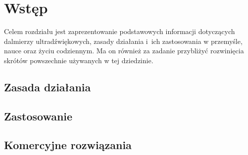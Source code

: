 \chapter{Wstęp}
\label{wstep}

Celem rozdziału jest zaprezentowanie podstawowych informacji dotyczących dalmierzy ultradźwiękowych, zasady działania i~ich zastosowania w przemyśle, nauce oraz życiu codziennym. 
Ma on również za zadanie przybliżyć rozwinięcia skrótów powszechnie używanych w tej dziedzinie.

\section{Zasada działania}\label{ch_02:zasada_dzialania}


\section{Zastosowanie} \label{sec:zastosowanie}

\section{Komercyjne rozwiązania} \label{sec:kom}